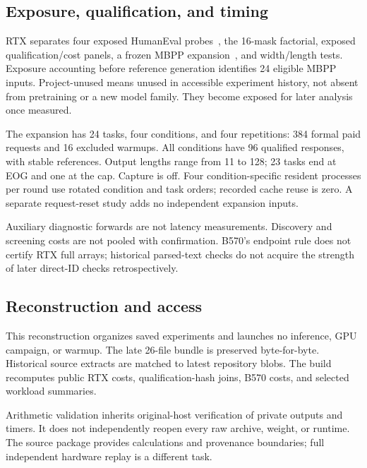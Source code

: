 \subsection{Exposure, qualification, and timing}
RTX separates four exposed HumanEval probes~\cite{humaneval}, the 16-mask factorial, exposed qualification/cost panels, a frozen MBPP expansion~\cite{mbpp}, and width/length tests. Exposure accounting before reference generation identifies 24 eligible MBPP inputs. Project-unused means unused in accessible experiment history, not absent from pretraining or a new model family. They become exposed for later analysis once measured.

The expansion has 24 tasks, four conditions, and four repetitions: 384 formal paid requests and 16 excluded warmups. All conditions have 96 qualified responses, with stable references. Output lengths range from 11 to 128; 23 tasks end at EOG and one at the cap. Capture is off. Four condition-specific resident processes per round use rotated condition and task orders; recorded cache reuse is zero. A separate request-reset study adds no independent expansion inputs.

Auxiliary diagnostic forwards are not latency measurements. Discovery and screening costs are not pooled with confirmation. B570's endpoint rule does not certify RTX full arrays; historical parsed-text checks do not acquire the strength of later direct-ID checks retrospectively.

\subsection{Reconstruction and access}
This reconstruction organizes saved experiments and launches no inference, GPU campaign, or warmup. The late 26-file bundle is preserved byte-for-byte. Historical source extracts are matched to latest repository blobs. The build recomputes public RTX costs, qualification-hash joins, B570 costs, and selected workload summaries.

Arithmetic validation inherits original-host verification of private outputs and timers. It does not independently reopen every raw archive, weight, or runtime. The source package provides calculations and provenance boundaries; full independent hardware replay is a different task.


